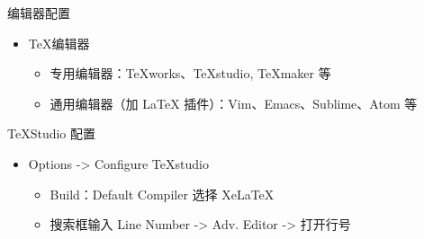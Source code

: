 \begin{frame}{编辑器配置}
  \begin{itemize}
    \item \TeX{}编辑器
      \begin{itemize}
        \item 专用编辑器：TeXworks、\alert{TeXstudio}, TeXmaker 等
        \item 通用编辑器（加 LaTeX 插件）：Vim、Emacs、Sublime、Atom 等
      \end{itemize}
  \end{itemize}
  \begin{exampleblock}{TeXStudio 配置}
    \begin{itemize}
      \item Options -> Configure TeXstudio
        \begin{itemize}
          \item Build：Default Compiler 选择 XeLaTeX
          \item 搜索框输入 Line Number -> Adv. Editor -> 打开行号
      \end{itemize}
  \end{itemize}
\end{exampleblock}
\end{frame}





